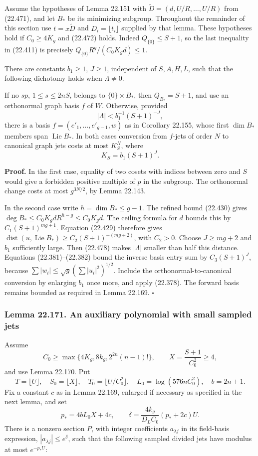 \documentclass[
  11pt,
  a4paper,
]{article}
\begin{document}
Assume the hypotheses of Lemma 22.151 with
\(\widetilde D=(d,U/R,\ldots,U/R)\) from (22.471), and let \(B_*\) be
its minimizing subgroup. Throughout the remainder of this section use
\(t=x\widetilde D\) and \(D_i=\lfloor t_i\rfloor\) supplied by that
lemma. These hypotheses hold if \(C_0\ge4K_g\) and (22.472) holds.
Indeed \(Q_{\{0\}}\le S+1\), so the last inequality in (22.411) is
precisely \(Q_{\{0\}}R^g/(C_0K_gd)\le1\).

There are constants \(b_1\ge1\), \(J\ge1\), independent of \(S,A,H,L\),
such that the following dichotomy holds when \(\Lambda\ne0\).

If no \(sp\), \(1\le s\le2nS\), belongs to \(\{0\}\times B_*\), then
\(Q_{B_*}=S+1\), and use an orthonormal graph basis \(f\) of \(W\).
Otherwise, provided \[
 |\Lambda|<b_1^{-1}(S+1)^{-J},
 \tag{22.478}
\] there is a basis \(f=(e'_1,\ldots,e'_{g-1},w)\) as in Corollary
22.155, whose first \(\dim B_*\) members span \(\operatorname{Lie}B_*\).
In both cases conversion from \(f\)-jets of order \(N\) to canonical
graph jets costs at most \(K_S^N\), where \[
 K_S=b_1(S+1)^J.
 \tag{22.479}
\]

\textbf{Proof.} In the first case, equality of two cosets with indices
between zero and \(S\) would give a forbidden positive multiple of \(p\)
in the subgroup. The orthonormal change costs at most \(g^{3N/2}\), by
Lemma 22.143.

In the second case write \(h=\dim B_*\le g-1\). The refined bound
(22.430) gives \(\deg B_*\le C_0K_gdR^{h-g}\le C_0K_gd\). The ceiling
formula for \(d\) bounds this by \(C_1(S+1)^{mg+1}\). Equation (22.429)
therefore gives \(\operatorname{dist}(u,\operatorname{Lie}B_*)
\ge C_2(S+1)^{-(mg+2)}\), with \(C_2>0\). Choose \(J\ge mg+2\) and
\(b_1\) sufficiently large. Then (22.478) makes \(|\Lambda|\) smaller
than half this distance. Equations (22.381)--(22.382) bound the inverse
basis entry sum by \(C_3(S+1)^J\), because
\(\sum|w_i|\le\sqrt g(\sum|u_i|^2)^{1/2}\). Include the
orthonormal-to-canonical conversion by enlarging \(b_1\) once more, and
apply (22.378). The forward basis remains bounded as required in Lemma
22.169. \(\square\)

\subsubsection{Lemma 22.171. An auxiliary polynomial with small sampled
jets}\label{lemma-22.171.-an-auxiliary-polynomial-with-small-sampled-jets}

Assume \[
 C_0\ge\max\{4K_g,8k_g,2^{2n}(n-1)!\},\qquad
 X=\frac{S+1}{C_0^2}\ge4,
 \tag{22.480}
\] and use Lemma 22.170. Put \[
 T=\lfloor U\rfloor,\quad S_0=\lfloor X\rfloor,
 \quad T_0=\lfloor U/C_0^2\rfloor,\quad
 L_0=\log(576nC_0^2),\quad b=2n+1.
 \tag{22.481}
\] Fix a constant \(c\) as in Lemma 22.169, enlarged if necessary as
specified in the next lemma, and set \[
 p_*=4bL_0X+4c,\qquad
 \delta=\frac{4k_g}{D_L C_0}(p_*+2c)U.
 \tag{22.482}
\] There is a nonzero section \(P\), with integer coefficients
\(a_{\lambda j}\) in its field-basis expression,
\(|a_{\lambda j}|\le e^\delta\), such that the following sampled divided
jets have modulus at most \(e^{-p_*U}\):
\end{document}
